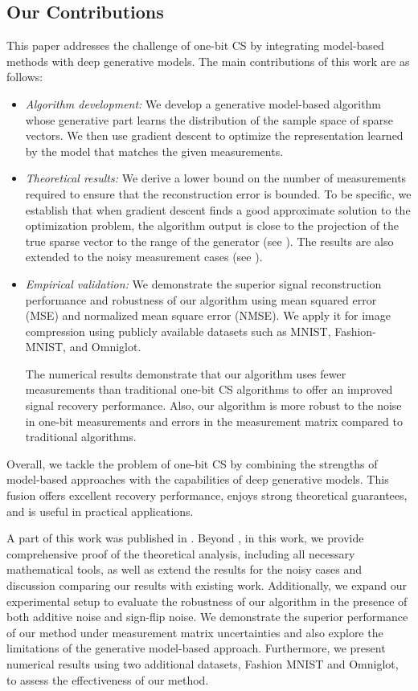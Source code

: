 \documentclass[journal]{IEEEtran}
\begin{document}
\subsection{Our Contributions}
This paper addresses the challenge of one-bit CS by integrating model-based methods with deep generative models. The main contributions of this work are as follows:
\begin{itemize}
\item\emph{Algorithm development:} We develop a generative model-based algorithm whose generative part learns the distribution of the sample space of sparse vectors. We then use gradient descent to optimize the representation learned by the model that matches the given measurements.
\item\emph{Theoretical results:} We derive a lower bound on the number of measurements required to ensure that the reconstruction error is bounded. To be specific, we establish that when gradient descent finds a good approximate solution to the optimization problem, the algorithm output is close to the projection of the true sparse vector to the range of the generator (see ). The results are also extended to the noisy measurement cases (see ).
\item\emph{Empirical validation:} We demonstrate the superior signal reconstruction performance and robustness of our algorithm using mean squared error (MSE) and normalized mean square error (NMSE). We apply it for image compression using publicly available datasets such as MNIST, Fashion-MNIST, and Omniglot. 

The numerical results demonstrate that our algorithm uses fewer measurements than traditional one-bit CS algorithms to offer an improved signal recovery performance. Also, our algorithm is more robust to the noise in one-bit measurements and errors in the measurement matrix compared to traditional algorithms. 
\end{itemize}
Overall, we tackle the problem of one-bit CS by combining the strengths of model-based approaches with the capabilities of deep generative models. This fusion offers excellent recovery performance, enjoys strong theoretical guarantees, and is useful in practical applications.  

A part of this work was published in \cite{joseph2020one}. Beyond \cite{joseph2020one}, in this work, we provide comprehensive proof of the theoretical analysis, including all necessary mathematical tools, as well as extend the results for the noisy cases and discussion comparing our results with existing work. Additionally, we expand our experimental setup to evaluate the robustness of our algorithm in the presence of both additive noise and sign-flip noise. We demonstrate the superior performance of our method under measurement matrix uncertainties and also explore the limitations of the generative model-based approach. Furthermore, we present numerical results using two additional datasets, Fashion MNIST and Omniglot, to assess the effectiveness of our method. 
\end{document}
